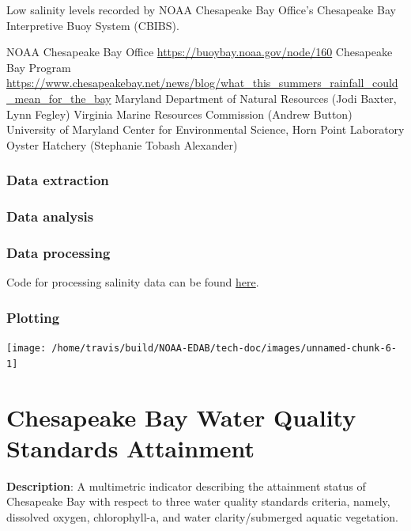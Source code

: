 \documentclass[
]{book}
\begin{document}
Low salinity levels recorded by NOAA Chesapeake Bay Office's Chesapeake Bay Interpretive Buoy System (CBIBS).

NOAA Chesapeake Bay Office \url{https://buoybay.noaa.gov/node/160}
Chesapeake Bay Program \url{https://www.chesapeakebay.net/news/blog/what_this_summers_rainfall_could_mean_for_the_bay}
Maryland Department of Natural Resources (Jodi Baxter, Lynn Fegley)
Virginia Marine Resources Commission (Andrew Button)
University of Maryland Center for Environmental Science, Horn Point Laboratory Oyster Hatchery (Stephanie Tobash Alexander)

\hypertarget{data-extraction-6}{%
\subsection{Data extraction}\label{data-extraction-6}}

\hypertarget{data-analysis-5}{%
\subsection{Data analysis}\label{data-analysis-5}}

\hypertarget{data-processing-4}{%
\subsection{Data processing}\label{data-processing-4}}

Code for processing salinity data can be found \href{https://github.com/NOAA-EDAB/ecodata/blob/master/data-raw/get_ch_bay_sal.R}{here}.

\hypertarget{plotting-4}{%
\subsection{Plotting}\label{plotting-4}}

\begin{center}\texttt{[image: /home/travis/build/NOAA-EDAB/tech-doc/images/unnamed-chunk-6-1]} \end{center}

\hypertarget{chesapeake-bay-water-quality-standards-attainment}{%
\chapter{Chesapeake Bay Water Quality Standards Attainment}\label{chesapeake-bay-water-quality-standards-attainment}}

\textbf{Description}: A multimetric indicator describing the attainment status of Chesapeake Bay with respect to three water quality standards criteria, namely, dissolved oxygen, chlorophyll-a, and water clarity/submerged aquatic vegetation.
\end{document}

